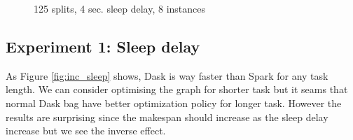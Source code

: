 \documentclass[11pt,a4paper]{article}
\begin{document}
\begin{figure}[p]
    \centering
    
    \caption{125 splits, 4 sec. sleep delay, 8 instances}
    \label{fig:inc_itr}
\end{figure}


\subsection{Experiment 1: Sleep delay}
As Figure \ref{fig:inc_sleep} shows, Dask is way faster than Spark for any task
length. We can consider optimising the graph for shorter task but it seams that
normal Dask bag have better optimization policy for longer task. However the results
are surprising since the makespan should increase as the sleep delay increase but we
see the inverse effect.
\end{document}
